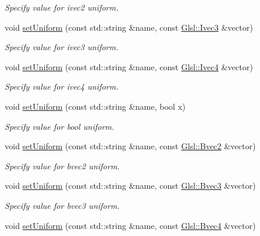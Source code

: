 \begin{DoxyCompactItemize}
\begin{DoxyCompactList}\small\item\em Specify value for {\ttfamily ivec2} uniform. \end{DoxyCompactList}\item 
void \hyperlink{classsf_1_1_shader_a9e328e3e97cd753fdc7b842f4b0f202e}{set\+Uniform} (const std\+::string \&name, const \hyperlink{namespacesf_1_1_glsl_a64f403dd0219e7f128ffddca641394df}{Glsl\+::\+Ivec3} \&vector)
\begin{DoxyCompactList}\small\item\em Specify value for {\ttfamily ivec3} uniform. \end{DoxyCompactList}\item 
void \hyperlink{classsf_1_1_shader_a380e7a5a2896162c5fd08966c4523790}{set\+Uniform} (const std\+::string \&name, const \hyperlink{structsf_1_1priv_1_1_vector4}{Glsl\+::\+Ivec4} \&vector)
\begin{DoxyCompactList}\small\item\em Specify value for {\ttfamily ivec4} uniform. \end{DoxyCompactList}\item 
void \hyperlink{classsf_1_1_shader_af417027ac72c06e6cfbf30975cd678e9}{set\+Uniform} (const std\+::string \&name, bool x)
\begin{DoxyCompactList}\small\item\em Specify value for {\ttfamily bool} uniform. \end{DoxyCompactList}\item 
void \hyperlink{classsf_1_1_shader_ab2518b8dd0762e682b452a5d5005f2bf}{set\+Uniform} (const std\+::string \&name, const \hyperlink{namespacesf_1_1_glsl_a59d8cf909c3d71ebf3db057480b464da}{Glsl\+::\+Bvec2} \&vector)
\begin{DoxyCompactList}\small\item\em Specify value for {\ttfamily bvec2} uniform. \end{DoxyCompactList}\item 
void \hyperlink{classsf_1_1_shader_ab06830875c82476fbb9c975cdeb78a11}{set\+Uniform} (const std\+::string \&name, const \hyperlink{namespacesf_1_1_glsl_a4166ffc506619b4912d576e6eba2c957}{Glsl\+::\+Bvec3} \&vector)
\begin{DoxyCompactList}\small\item\em Specify value for {\ttfamily bvec3} uniform. \end{DoxyCompactList}\item 
void \hyperlink{classsf_1_1_shader_ac8db3e0adf1129abf24f0a51a7ec36f4}{set\+Uniform} (const std\+::string \&name, const \hyperlink{structsf_1_1priv_1_1_vector4}{Glsl\+::\+Bvec4} \&vector)

\end{DoxyCompactItemize}

